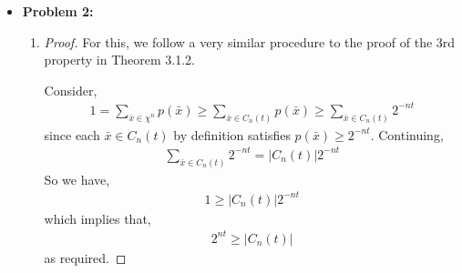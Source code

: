 \documentclass[10pt,twoside]{article}
\begin{document}
\begin{itemize}
\begin{enumerate}
\begin{proof}
            From part (c), we know that $A^n\cap B^n\subseteq A_{\epsilon}^{(n)}$. Therefore, for any $\bar{x}\in A^n\cap B^n$, we know $\bar{x}\in A_{\epsilon}^{(n)}$, and from the definition of the typical set, we have that \newline$p(\bar{x})\leq 2^{-n(H - \epsilon)}$. Putting this together, we have that
            \begin{gather*}
                \frac{1}{2} \leq p(\bar{x})\leq 2^{-n(H - \epsilon)}
            \end{gather*}
            Summing over all possible $\bar{x}\in A^n\cap B^n$, we get,
            \begin{gather*}
                \frac{1}{2}\leq \sum_{\bar{x}\in A^n\cap B^n} p(\bar{x})\leq \sum_{\bar{x}\in A^n\cap B^n} 2^{-n(H - \epsilon)} = |A^n\cap B^n|2^{-n(H - \epsilon)} \\
                \frac{1}{2} \leq |A^n\cap B^n|2^{-n(H - \epsilon)} \\
                \Rightarrow \frac{1}{2}2^{n(H-\epsilon)} \leq |A^n\cap B^n| \\
            \end{gather*}
            as required.
        \end{proof}
        
    \end{enumerate}

    \newpage
    
    \item\textbf{Problem 2:} \newline
    \noindent\makebox[\linewidth]{\rule{18cm}{0.4pt}}
    \begin{enumerate}
        \item \begin{proof}
            For this, we follow a very similar procedure to the proof of the 3rd property in Theorem 3.1.2.

            Consider, 
            \begin{gather*}
                1 =  \sum_{\bar{x}\in \chi^n} p(\bar{x}) \geq  \sum_{\bar{x}\in C_n(t)} p(\bar{x}) \geq \sum_{\bar{x}\in C_n(t)} 2^{-nt}
            \end{gather*}
            since each $\bar{x}\in C_n(t)$ by definition satisfies $p(\bar{x})\geq 2^{-nt}$. Continuing,
            \begin{gather*}
                 \sum_{\bar{x}\in C_n(t)} 2^{-nt} = |C_n(t)|2^{-nt}
            \end{gather*}
            So we have,
            \begin{gather*}
                1 \geq |C_n(t)|2^{-nt}
            \end{gather*}
            which implies that,
            \begin{gather*}
                2^{nt} \geq |C_n(t)|
            \end{gather*}
            as required.
        \end{proof}


\end{enumerate}
\end{itemize}
\end{document}
